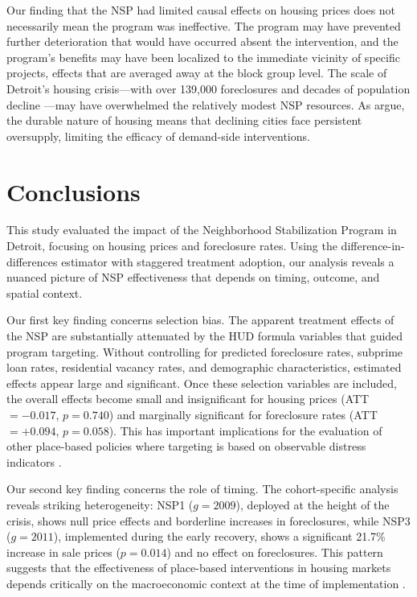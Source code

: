 \documentclass[12pt,authoryear]{elsarticle}
\begin{document}
Our finding that the NSP had limited causal effects on housing prices does not necessarily mean the program was ineffective. The program may have prevented further deterioration that would have occurred absent the intervention, and the program's benefits may have been localized to the immediate vicinity of specific projects, effects that are averaged away at the block group level. The scale of Detroit's housing crisis---with over 139,000 foreclosures and decades of population decline \citep{alm2014}---may have overwhelmed the relatively modest NSP resources. As \citet{glaeser2005} argue, the durable nature of housing means that declining cities face persistent oversupply, limiting the efficacy of demand-side interventions.


\section{Conclusions}
\label{sec:conclusion}

This study evaluated the impact of the Neighborhood Stabilization Program in Detroit, focusing on housing prices and foreclosure rates. Using the \citet{callaway2021} difference-in-differences estimator with staggered treatment adoption, our analysis reveals a nuanced picture of NSP effectiveness that depends on timing, outcome, and spatial context.

Our first key finding concerns selection bias. The apparent treatment effects of the NSP are substantially attenuated by the HUD formula variables that guided program targeting. Without controlling for predicted foreclosure rates, subprime loan rates, residential vacancy rates, and demographic characteristics, estimated effects appear large and significant. Once these selection variables are included, the overall effects become small and insignificant for housing prices (ATT $= -0.017$, $p = 0.740$) and marginally significant for foreclosure rates (ATT $= +0.094$, $p = 0.058$). This has important implications for the evaluation of other place-based policies where targeting is based on observable distress indicators \citep{ding2016}.

Our second key finding concerns the role of timing. The cohort-specific analysis reveals striking heterogeneity: NSP1 ($g = 2009$), deployed at the height of the crisis, shows null price effects and borderline increases in foreclosures, while NSP3 ($g = 2011$), implemented during the early recovery, shows a significant 21.7\% increase in sale prices ($p = 0.014$) and no effect on foreclosures. This pattern suggests that the effectiveness of place-based interventions in housing markets depends critically on the macroeconomic context at the time of implementation \citep{kline2013}.
\end{document}
